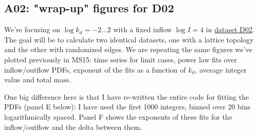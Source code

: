 \documentclass[11pt]{article}
\begin{document}
\clearpage

\subsection{A02: "wrap-up" figures for D02}
\label{subsec:A02}

We’re focusing on $\log k_d = -2...2$ with a fixed inflow $\log I = 4$ in \hyperref[subsec:D02]{dataset D02}. The goal will be to calculate two identical datasets, one with a lattice topology and the other with randomized edges. We are repeating the same figures we’ve plotted previously in MS15: time series for limit cases, power law fits over inflow/outflow PDFs, exponent of the fits as a function of $k_d$, average integer value and total mass.

One big difference here is that I have re-written the entire code for fitting the PDFs (panel E below): I have used the first 1000 integers, binned over 20 bins logarithmically spaced. Panel F shows the exponents of these fits for the inflow/outflow and the delta between them. 
\end{document}
